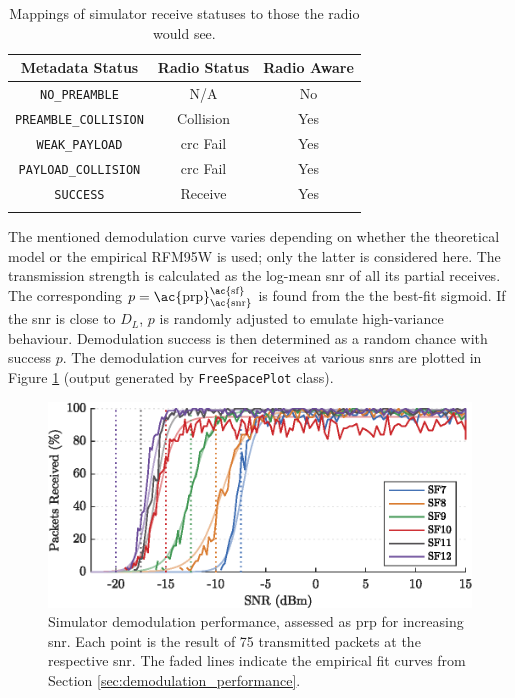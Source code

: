 \begin{table}[H]
\centering\small
\caption[Simulator metadata to radio status mappings]{Mappings of simulator receive statuses to those the radio would see.}
\begin{tabular}{c|cc}
    \toprule
    \textbf{Metadata Status} & \textbf{Radio Status} & \textbf{Radio Aware} \\
    \midrule\addlinespace
	\texttt{NO\_PREAMBLE} & N/A & No \\
	\texttt{PREAMBLE\_COLLISION} & Collision & Yes \\
	\texttt{WEAK\_PAYLOAD} & \ac{crc} Fail & Yes \\
	\texttt{PAYLOAD\_COLLISION} & \ac{crc} Fail & Yes \\
	\texttt{SUCCESS} & Receive & Yes \\
    \addlinespace\bottomrule
\end{tabular}
\label{tab:sim_metadata_translation}
\end{table}

The mentioned demodulation curve varies depending on whether the theoretical model or the empirical RFM95W is used; only the latter is considered here. The transmission strength is calculated as the log-mean \ac{snr} of all its partial receives. The corresponding $p=\text{\ac{prp}}_{\text{\ac{snr}}}^{\text{\ac{sf}}}$ is found from the the best-fit sigmoid. If the \ac{snr} is close to $D_L$, $p$ is randomly adjusted to emulate high-variance behaviour. Demodulation success is then determined as a random chance with success $p$. The demodulation curves for receives at various \ac{snr}s are plotted in Figure \ref{fig:sf_sim_plot} (output generated by \texttt{FreeSpacePlot} class).

\begin{figure}[H]
    \centering
   	\includegraphics{Figures/sf_sim_plot}
    \caption[Simulator demodulation performance]{
    	Simulator demodulation performance, assessed as \ac{prp} for increasing \ac{snr}. Each point is the result of 75 transmitted packets at the respective \ac{snr}. The faded lines indicate the empirical fit curves from Section \ref{sec:demodulation_performance}. 
    }
    \label{fig:sf_sim_plot}
\end{figure}


